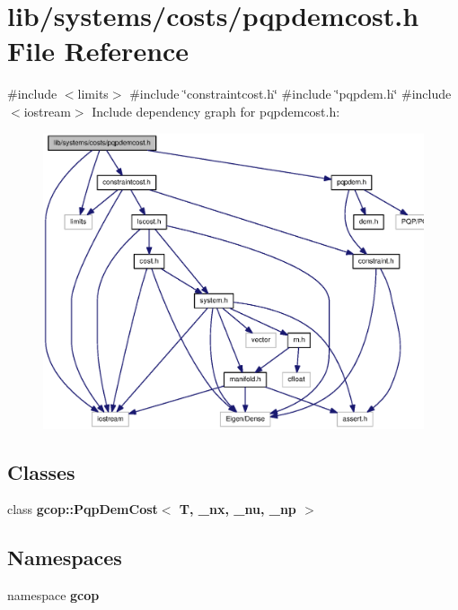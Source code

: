 \section{lib/systems/costs/pqpdemcost.h \-File \-Reference}
\label{pqpdemcost_8h}
{\ttfamily \#include $<$limits$>$}\*
{\ttfamily \#include \char`\"{}constraintcost.\-h\char`\"{}}\*
{\ttfamily \#include \char`\"{}pqpdem.\-h\char`\"{}}\*
{\ttfamily \#include $<$iostream$>$}\*
\-Include dependency graph for pqpdemcost.\-h\-:\nopagebreak
\begin{figure}[H]
\begin{center}
\leavevmode
\includegraphics[width=350pt]{pqpdemcost_8h__incl}
\end{center}
\end{figure}
\subsection*{\-Classes}
\begin{DoxyCompactItemize}
\item 
class {\bf gcop\-::\-Pqp\-Dem\-Cost$<$ T, \-\_\-nx, \-\_\-nu, \-\_\-np $>$}
\end{DoxyCompactItemize}
\subsection*{\-Namespaces}
\begin{DoxyCompactItemize}
\item 
namespace {\bf gcop}
\end{DoxyCompactItemize}
